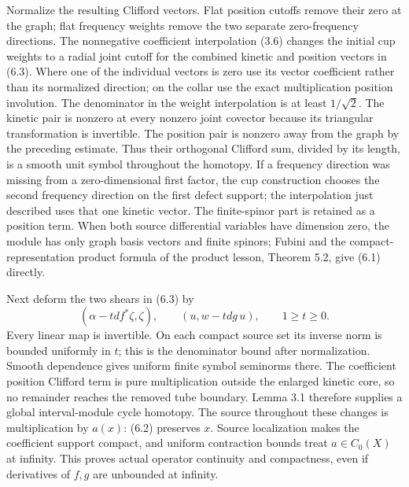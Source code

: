 \documentclass[
  11pt,
]{article}
\begin{document}
Normalize the resulting Clifford vectors. Flat position cutoffs remove
their zero at the graph; flat frequency weights remove the two separate
zero-frequency directions. The nonnegative coefficient interpolation
(3.6) changes the initial cup weights to a radial joint cutoff for the
combined kinetic and position vectors in (6.3). Where one of the
individual vectors is zero use its vector coefficient rather than its
normalized direction; on the collar use the exact multiplication
position involution. The denominator in the weight interpolation is at
least \(1/\sqrt2\). The kinetic pair is nonzero at every nonzero joint
covector because its triangular transformation is invertible. The
position pair is nonzero away from the graph by the preceding estimate.
Thus their orthogonal Clifford sum, divided by its length, is a smooth
unit symbol throughout the homotopy. If a frequency direction was
missing from a zero-dimensional first factor, the cup construction
chooses the second frequency direction on the first defect support; the
interpolation just described uses that one kinetic vector. The
finite-spinor part is retained as a position term. When both source
differential variables have dimension zero, the module has only graph
basis vectors and finite spinors; Fubini and the compact-representation
product formula of the product lesson, Theorem 5.2, give (6.1) directly.

Next deform the two shears in (6.3) by \[
 (\alpha-t df^*\zeta,\zeta),\qquad
 (u,w-t dg\,u),\qquad 1\geq t\geq0.
 \tag{6.4}
\] Every linear map is invertible. On each compact source set its
inverse norm is bounded uniformly in \(t\); this is the denominator
bound after normalization. Smooth dependence gives uniform finite symbol
seminorms there. The coefficient position Clifford term is pure
multiplication outside the enlarged kinetic core, so no remainder
reaches the removed tube boundary. Lemma 3.1 therefore supplies a global
interval-module cycle homotopy. The source throughout these changes is
multiplication by \(a(x)\): (6.2) preserves \(x\). Source localization
makes the coefficient support compact, and uniform contraction bounds
treat \(a\in C_0(X)\) at infinity. This proves actual operator
continuity and compactness, even if derivatives of \(f,g\) are unbounded
at infinity.
\end{document}

